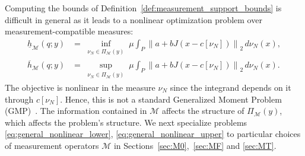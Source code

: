 \documentclass[11pt,a4paper]{article}
\theoremstyle{proposition}
\begin{document}
Computing the bounds of Definition~\ref{def:measurement_support_bounds} is difficult in general as it leads to a nonlinear optimization problem over measurement-compatible measures:
\begin{align}
    \underline h_{\mathcal M}(q;y)
    &=
    \inf_{\substack{\nu_N\in\Pi_{\mathcal M}(y)}} %
    \mu
    \int_P
    \left\|
    a+bJ\left(
    x-
    c[\nu_N]
    \right)
    \right\|_2
    \,d\nu_N(x),
    \label{eq:general_nonlinear_lower}
    \\
    \overline h_{\mathcal M}(q;y)
    &=
    \sup_{\substack{\nu_N\in\Pi_{\mathcal M}(y)}} %
    \mu
    \int_P
    \left\|
    a+bJ\left(
    x-
    c[\nu_N]
    \right)
    \right\|_2
    \,d\nu_N(x).
    \label{eq:general_nonlinear_upper}
\end{align}
The objective is nonlinear in the measure $\nu_N$ since the integrand depends
on it through $c[\nu_N]$. Hence, this is not a standard Generalized
Moment Problem (GMP)~\cite{lasserre2010moments}. 
The information contained in $\mathcal M$ affects the structure of $\Pi_{\mathcal M}(y)$, which affects the problem's structure. We next specialize problems \eqref{eq:general_nonlinear_lower}, \eqref{eq:general_nonlinear_upper} to particular choices of measurement operators $\mathcal{M}$ in Sections~\ref{sec:M0},~\ref{sec:MF} and \ref{sec:MT}.
\end{document}
